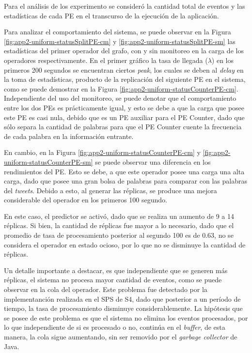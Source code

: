 Para el análisis de los experimento se consideró la cantidad total de eventos y las estadísticas de cada PE en el transcurso de la ejecución de la aplicación.

Para analizar el comportamiento del sistema, se puede observar en la Figura \ref{fig:app2-uniform-statusSplitPE-cm} y \ref{fig:app2-uniform-statusSplitPE-sm} las estadísticas del primer operador del grafo, con y sin monitoreo en la carga de los operadores respectivamente. En el primer gráfico la tasa de llegada ($\lambda$) en los primeros 200 segundos se encuentran ciertos \textit{peak}, los cuales se deben al \textit{delay} en la toma de estadísticas, producto de la replicación del siguiente PE en el sistema, como se puede demostrar en la Figura \ref{fig:app2-uniform-statusCounterPE-cm}. Independiente del uso del monitoreo, se puede denotar que el comportamiento entre los dos PEs es prácticamente igual, y esto se debe a que la carga que posee este PE es casi nula, debido que es un PE auxiliar para el PE Counter, dado que sólo separa la cantidad de palabras para que el PE Counter cuente la frecuencia de cada palabra en la información entrante.

En cambio, en la Figura \ref{fig:app2-uniform-statusCounterPE-cm} y \ref{fig:app2-uniform-statusCounterPE-sm} se puede observar una diferencia en los rendimientos del PE. Esto se debe, a que este operador posee una carga una alta carga, dado que posee una gran bolsa de palabras para comparar con las palabras del \textit{tweets}. Debido a esto, al generar las réplicas, se produce una mejora considerable del operador en los primeros 100 segundo.

En este caso, el predictor se activó, dado que se realiza un aumento de 9 a 14 réplicas. Si bien, la cantidad de réplicas fue mayor a lo necesario, dado que el promedio de tasa de procesamiento posterior al segundo 100 es de 0.63, no se considera el operador en estado ocioso, por lo que no se disminuye la cantidad de réplicas.

Un detalle importante a destacar, es que independiente que se generen más réplicas, el sistema no procesa mayor cantidad de eventos, como se puede observar en la cola del operador. Este problema fue detectado por la implementanción realizada en el SPS de S4, dado que posterior a un período de tiempo, la tasa de procesamiento disminuye considerablemente. La hipótesis que se posee de este problema es que el sistema no elimina los eventos procesados, por lo que independiente de si es procesado o no, continúa en el \textit{buffer}, de esta manera, la cola sigue aumentando, sin ser removido por el \textit{garbage collector} de Java.

